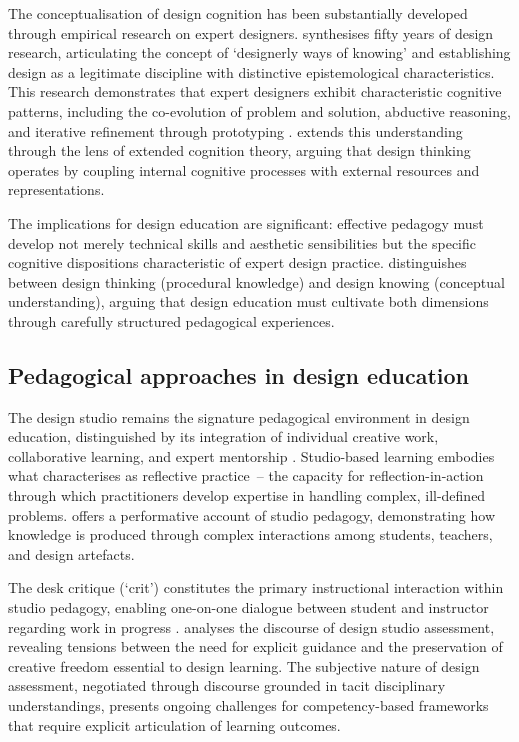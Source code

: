 \documentclass[ed]{acnsart}
\begin{document}
	The conceptualisation of design cognition has been substantially developed through empirical research on expert designers. \citet{Cross2018691} synthesises fifty years of design research, articulating the concept of `designerly ways of knowing' and establishing design as a legitimate discipline with distinctive epistemological characteristics. This research demonstrates that expert designers exhibit characteristic cognitive patterns, including the co-evolution of problem and solution, abductive reasoning, and iterative refinement through prototyping \cite{Kokotovich200849, Atman2019125}. \citet{Haupt2015483} extends this understanding through the lens of extended cognition theory, arguing that design thinking operates by coupling internal cognitive processes with external resources and representations.
	
	The implications for design education are significant: effective pedagogy must develop not merely technical skills and aesthetic sensibilities but the specific cognitive dispositions characteristic of expert design practice. \citet{Chon2019187} distinguishes between design thinking (procedural knowledge) and design knowing (conceptual understanding), arguing that design education must cultivate both dimensions through carefully structured pedagogical experiences.
	
	\subsection{Pedagogical approaches in design education}
	
	The design studio remains the signature pedagogical environment in design education, distinguished by its integration of individual creative work, collaborative learning, and expert mentorship \cite{Goldschmidt2010285}. Studio-based learning embodies what \citet{Schon1983} characterises as reflective practice~-- the capacity for reflection-in-action through which practitioners develop expertise in handling complex, ill-defined problems. \citet{Mewburn2012363} offers a performative account of studio pedagogy, demonstrating how knowledge is produced through complex interactions among students, teachers, and design artefacts.
	
	The desk critique (`crit') constitutes the primary instructional interaction within studio pedagogy, enabling one-on-one dialogue between student and instructor regarding work in progress \cite{Goldschmidt2010285}. \citet{Ardington2017157} analyses the discourse of design studio assessment, revealing tensions between the need for explicit guidance and the preservation of creative freedom essential to design learning. The subjective nature of design assessment, negotiated through discourse grounded in tacit disciplinary understandings, presents ongoing challenges for competency-based frameworks that require explicit articulation of learning outcomes.
	
\end{document}
